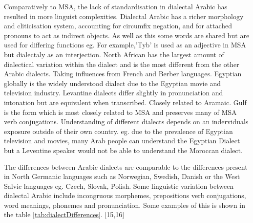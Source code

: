 Comparatively to MSA, the lack of standardisation in dialectal Arabic has resulted in more linguist complexities.
Dialectal Arabic has a richer morphology and cliticisation system, accounting for circumfix negation, 
and for attached pronouns to act as indirect objects. As well as this some words are shared but are used for
differing functions eg. For example,'Tyb' is used as an adjective in MSA but dialectaly as an interjection. 
North African has the largest amount of dialectical variation within the dialect and is the most different from the other Arabic dialects. Taking influences from French and Berber languages. 
Egyptian globally is the widely understood dialect due to the Egyptian movie and television industry. 
Levantine dialects differ slightly in pronunciation and intonation but are equivalent when transcribed. Closely related to Aramaic. 
Gulf is the form which is most closely related to MSA and preserves many of MSA verb conjugations. 
Understanding of different dialects depends on an inderviduals exposure outside of their own country. eg. due to the prevalence of Egyptian television and movies,
many Arab people can understand the Egyptian Dialect but a Leventine speaker would not be able to understand 
the Moroccan dialect. 

The differences between Arabic dialects are comparable to the differences present in North Germanic languages such as
Norwegian, Swedish, Danish or the West Salvic languages eg. Czech, Slovak, Polish. Some linguistic variation between dialectal Arabic include incongruous morphemes, prepositions
verb conjugations, word meanings, phonemes and pronunciation. Some examples of this is shown in the table \ref{tab:dialectDifferences}. [15,16]\\

